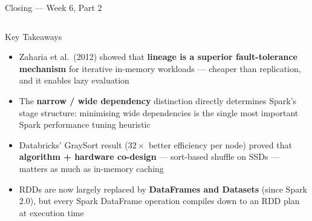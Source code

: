 \documentclass[aspectratio=169,10pt]{beamer}
\begin{document}
\begin{frame}{Closing — Week 6, Part 2}
  \begin{columns}[T]
      \begin{block}{Key Takeaways}
        \begin{itemize}
          \item Zaharia et al.\ (2012) showed that
                \textbf{lineage is a superior fault-tolerance mechanism}
                for iterative in-memory workloads — cheaper than
                replication, and it enables lazy evaluation
          \item The \textbf{narrow / wide dependency} distinction
                directly determines Spark's stage structure:
                minimising wide dependencies is the single most
                important Spark performance tuning heuristic
          \item Databricks' GraySort result ($32\times$ better
                efficiency per node) proved that \textbf{algorithm +
                hardware co-design} — sort-based shuffle on SSDs —
                matters as much as in-memory caching
          \item RDDs are now largely replaced by \textbf{DataFrames and
                Datasets} (since Spark 2.0), but every Spark DataFrame
                operation compiles down to an RDD plan at execution time
        \end{itemize}
      \end{block}


\end{columns}
\end{frame}
\end{document}
